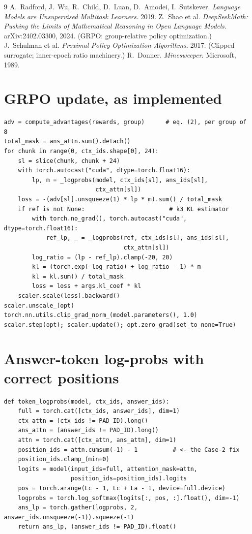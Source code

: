 \documentclass[11pt]{article}
\begin{document}
\begin{thebibliography}{9}
 A.~Radford, J.~Wu, R.~Child, D.~Luan, D.~Amodei,
I.~Sutskever. \emph{Language Models are Unsupervised Multitask Learners}. 2019.
 Z.~Shao et al. \emph{DeepSeekMath: Pushing the
Limits of Mathematical Reasoning in Open Language Models}. arXiv:2402.03300, 2024.
(GRPO: group-relative policy optimization.)
 J.~Schulman et al. \emph{Proximal Policy Optimization
Algorithms}. 2017. (Clipped surrogate; inner-epoch ratio machinery.)
 R.~Donner. \emph{Minesweeper}. Microsoft, 1989.
\end{thebibliography}

\appendix

\section{GRPO update, as implemented}
\begin{lstlisting}[caption={Microbatched group-relative update (grpo.py, simplified).}]
adv = compute_advantages(rewards, group)      # eq. (2), per group of 8
total_mask = ans_attn.sum().detach()
for chunk in range(0, ctx_ids.shape[0], 24):
    sl = slice(chunk, chunk + 24)
    with torch.autocast("cuda", dtype=torch.float16):
        lp, m = _logprobs(model, ctx_ids[sl], ans_ids[sl],
                          ctx_attn[sl])
    loss = -(adv[sl].unsqueeze(1) * lp * m).sum() / total_mask
    if ref is not None:                        # k3 KL estimator
        with torch.no_grad(), torch.autocast("cuda", dtype=torch.float16):
            ref_lp, _ = _logprobs(ref, ctx_ids[sl], ans_ids[sl],
                                  ctx_attn[sl])
        log_ratio = (lp - ref_lp).clamp(-20, 20)
        kl = (torch.exp(-log_ratio) + log_ratio - 1) * m
        kl = kl.sum() / total_mask
        loss = loss + args.kl_coef * kl
    scaler.scale(loss).backward()
scaler.unscale_(opt)
torch.nn.utils.clip_grad_norm_(model.parameters(), 1.0)
scaler.step(opt); scaler.update(); opt.zero_grad(set_to_none=True)
\end{lstlisting}

\section{Answer-token log-probs with correct positions}
\begin{lstlisting}[caption={The scoring path that must match generate() (common.py).}]
def token_logprobs(model, ctx_ids, answer_ids):
    full = torch.cat([ctx_ids, answer_ids], dim=1)
    ctx_attn = (ctx_ids != PAD_ID).long()
    ans_attn = (answer_ids != PAD_ID).long()
    attn = torch.cat([ctx_attn, ans_attn], dim=1)
    position_ids = attn.cumsum(-1) - 1          # <- the Case-2 fix
    position_ids.clamp_(min=0)
    logits = model(input_ids=full, attention_mask=attn,
                   position_ids=position_ids).logits
    pos = torch.arange(Lc - 1, Lc + La - 1, device=full.device)
    logprobs = torch.log_softmax(logits[:, pos, :].float(), dim=-1)
    ans_lp = torch.gather(logprobs, 2, answer_ids.unsqueeze(-1)).squeeze(-1)
    return ans_lp, (answer_ids != PAD_ID).float()
\end{lstlisting}
\end{document}
